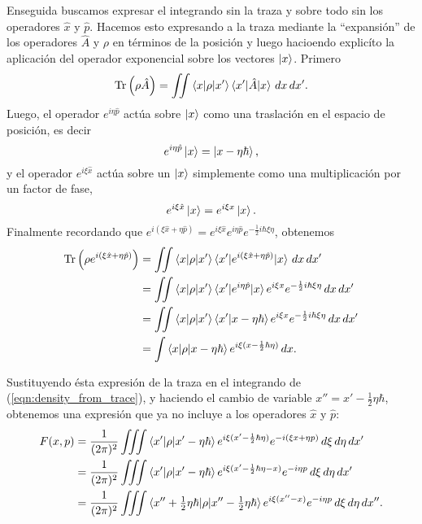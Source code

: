\documentclass[a4paper]{report}
\DeclareMathOperator{\Tr}{Tr}
\begin{document}
  Enseguida buscamos expresar el integrando sin la traza y
  sobre todo sin los operadores $\hat{x}$ y $\hat{p}$.
  Hacemos esto expresando a la traza mediante la
  ``expansión'' de los operadores $\hat{A}$ y $\rho$ en
  términos de la posición y luego hacioendo explicíto la
  aplicación del operador exponencial sobre los vectores
  $\ket x$. Primero
  \begin{equation}
    \Tr\left( \rho \hat{A} \right) 
    = \iint \braket{x|\rho|x'} \braket{x'|\hat{A}|x} \, dx
    \, dx'.
  \end{equation}
  Luego, el operador $e^{i\eta \hat{p}}$ actúa sobre $\ket
  x$ como una traslación en el espacio de posición, es decir
  \[
    e^{i\eta \hat{p}} \ket x
    = \ket{x - \eta \hbar},
  \] 
  y el operador $e^{i\xi \hat{x}}$ actúa sobre un $\ket x$ 
  simplemente como una multiplicación por un factor de fase,
  \[
    e^{i\xi \hat{x}} \ket x
    = e^{i\xi x} \ket x.
  \] 
  Finalmente recordando que $e^{i(\xi \hat{x} + \eta
  \hat{p})} = e^{i \xi \hat{x}} e^{i \eta \hat{p}}
  e^{-\frac{1}{2}i\hbar \xi \eta}$, obtenemos
  \begin{align*}
    \Tr\left( \rho e^{i(\xi \hat{x} + \eta \hat{p})} \right) 
    &= \iint \braket{x|\rho|x'} \braket{x'| e^{i(\xi \hat{x}
    + \eta \hat{p})}|x} \, dx \, dx' \\
    &= \iint \braket{x|\rho|x'} \braket{x'|e^{i\eta
    \hat{p}}|x} e^{i\xi x}e^{-\frac{1}{2} i \hbar \xi \eta}
    \, dx \, dx' \\
    &=  \iint \braket{x|\rho|x'} \braket{x'|x - \eta \hbar}
    e^{i\xi x}e^{-\frac{1}{2} i \hbar \xi \eta} \, dx \, dx'
    \\
    &= \int \braket{x|\rho|x - \eta \hbar} e^{i\xi (x
    -\frac{1}{2} \hbar \eta)} \, dx.
  \end{align*}

  Sustituyendo ésta expresión de la traza en el integrando
  de (\ref{eqn:density_from_trace}), y haciendo el cambio de
  variable $x'' = x' - \frac{1}{2}\eta\hbar$, obtenemos una
  expresión que ya no incluye a los operadores $\hat{x}$ y
  $\hat{p}$:
  \begin{align*}
    F(x,p)
    &= \frac{1}{(2\pi)^2} \iiint \braket{x'|\rho|x' -
    \eta\hbar} e^{i\xi(x' - \frac{1}{2}\hbar \eta)}
    e^{-i(\xi x + \eta p)} \, d\xi \, d\eta \, dx'\\
    &= \frac{1}{(2\pi)^2}\iiint \braket{x'|\rho|x'-\eta
    \hbar} e^{i\xi(x' - \frac{1}{2}\hbar\eta - x)} e^{-i\eta
    p} \, d\xi \, d\eta \, dx' \\
    &= \frac{1}{(2\pi)^2}\iiint \braket{x'' + \tfrac{1}{2}
    \eta \hbar|\rho|x'' - \tfrac{1}{2} \eta \hbar}
    e^{i\xi(x'' - x)} e^{-i\eta p} \, d\xi \, d\eta \, dx''.
  \end{align*}
\end{document}

